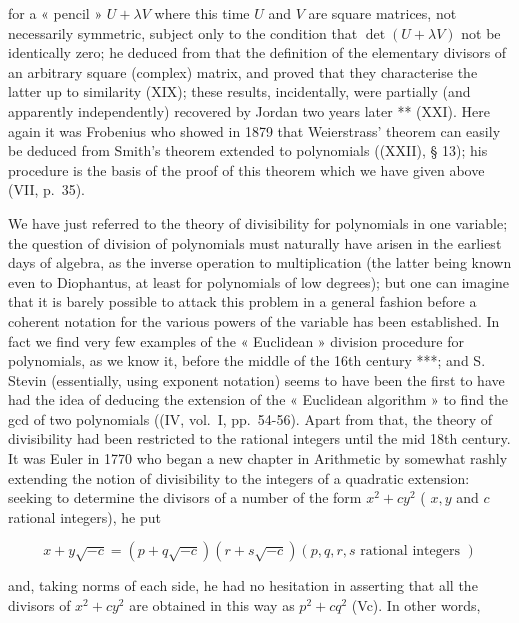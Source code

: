 for a « pencil » \(U + \lambda V\) where this time \(U\) and \(V\) are square matrices, not necessarily symmetric, subject only to the condition that \(\det(U + \lambda V)\) not be identically zero; he deduced from that the definition of the elementary divisors of an arbitrary square (complex) matrix, and proved that they characterise the latter up to similarity (XIX); these results, incidentally, were partially (and apparently independently) recovered by Jordan two years later ** (XXI). Here again it was Frobenius who showed in 1879 that Weierstrass' theorem can easily be deduced from Smith's theorem extended to polynomials ((XXII), § 13); his procedure is the basis of the proof of this theorem which we have given above (VII, p.~35).

We have just referred to the theory of divisibility for polynomials in one variable; the question of division of polynomials must naturally have arisen in the earliest days of algebra, as the inverse operation to multiplication (the latter being known even to Diophantus, at least for polynomials of low degrees); but one can imagine that it is barely possible to attack this problem in a general fashion before a coherent notation for the various powers of the variable has been established. In fact we find very few examples of the « Euclidean » division procedure for polynomials, as we know it, before the middle of the 16th century ***; and S. Stevin (essentially, using exponent notation) seems to have been the first to have had the idea of deducing the extension of the « Euclidean algorithm » to find the gcd of two polynomials ((IV, vol.~I, pp.~54-56). Apart from that, the theory of divisibility had been restricted to the rational integers until the mid 18th century. It was Euler in 1770 who began a new chapter in Arithmetic by somewhat rashly extending the notion of divisibility to the integers of a quadratic extension: seeking to determine the divisors of a number of the form \(x^{2} + cy^{2}\) ( \(x, y\) and \(c\) rational integers), he put

\[
x + y \sqrt {- c} = (p + q \sqrt {- c}) (r + s \sqrt {- c}) (p, q, r, s \text { rational   integers })
\]

and, taking norms of each side, he had no hesitation in asserting that all the divisors of \(x^{2} + cy^{2}\) are obtained in this way as \(p^{2} + cq^{2}\) (Vc). In other words,

